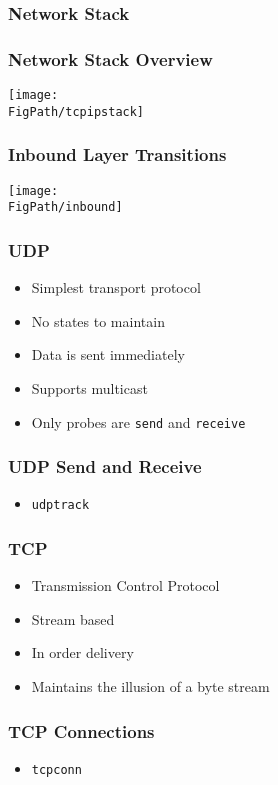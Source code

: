 \documentclass[pdftex]{beamer}
\begin{document}
\begin{frame}
  \frametitle{Network Stack}
\end{frame}

\begin{frame}
  \frametitle{Network Stack Overview}
\centering
\texttt{[image: \\FigPath/tcpipstack]}
\end{frame}

\begin{frame}
\centering
  \frametitle{Inbound Layer Transitions}
\texttt{[image: \\FigPath/inbound]}
\end{frame}

\begin{frame}[fragile]
  \frametitle{UDP}
  \begin{itemize}
  \item Simplest transport protocol
  \item No states to maintain
  \item Data is sent immediately
  \item Supports multicast
  \item Only probes are \verb+send+ and \verb+receive+
  \end{itemize}
\end{frame}

\begin{frame}[fragile]
  \frametitle{UDP Send and Receive}
  \begin{itemize}
  \item \verb|udptrack|
  \end{itemize}
\end{frame}

\begin{frame}
  \frametitle{TCP}
  \begin{itemize}
  \item Transmission Control Protocol
  \item Stream based
  \item In order delivery
  \item Maintains the illusion of a byte stream
  \end{itemize}
\end{frame}

\begin{frame}[fragile]
  \frametitle{TCP Connections}
  \begin{itemize}
  \item \verb|tcpconn|
  \end{itemize}
\end{frame}
\end{document}

